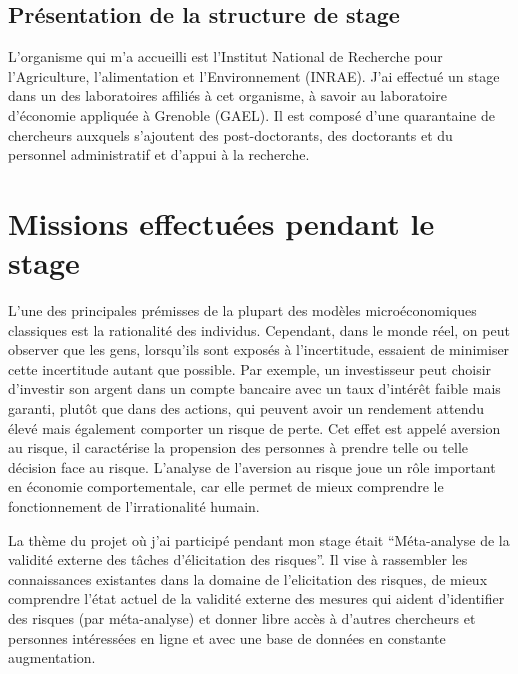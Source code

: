 \documentclass[12pt]{article}
\begin{document}
\subsection{Présentation de la structure de stage}

L'organisme qui m'a accueilli est l'Institut National de Recherche pour
l'Agriculture, l'alimentation et l'Environnement (INRAE). J'ai effectué
un stage dans un des laboratoires affiliés à cet organisme, à savoir au
laboratoire d'économie appliquée à Grenoble (GAEL). Il est composé d'une
quarantaine de chercheurs auxquels s'ajoutent des post-doctorants, des
doctorants et du personnel administratif et d'appui à la recherche.

\section{Missions effectuées pendant le stage}
\label{sec:third}

L'une des principales prémisses de la plupart des modèles
microéconomiques classiques est la rationalité des individus. Cependant,
dans le monde réel, on peut observer que les gens, lorsqu'ils sont
exposés à l'incertitude, essaient de minimiser cette incertitude autant
que possible. Par exemple, un investisseur peut choisir d'investir son
argent dans un compte bancaire avec un taux d'intérêt faible mais
garanti, plutôt que dans des actions, qui peuvent avoir un rendement
attendu élevé mais également comporter un risque de perte. Cet effet est
appelé aversion au risque, il caractérise la propension des personnes à
prendre telle ou telle décision face au risque. L'analyse de l'aversion
au risque joue un rôle important en économie comportementale, car elle
permet de mieux comprendre le fonctionnement de l'irrationalité humain.

La thème du projet où j'ai participé pendant mon stage était
``Méta-analyse de la validité externe des tâches d'élicitation des
risques''. Il vise à rassembler les connaissances existantes dans la
domaine de l'elicitation des risques, de mieux comprendre l'état actuel
de la validité externe des mesures qui aident d'identifier des risques
(par méta-analyse) et donner libre accès à d'autres chercheurs et
personnes intéressées en ligne et avec une base de données en constante
augmentation.
\end{document}
